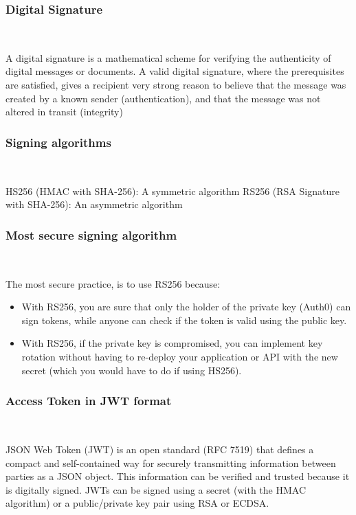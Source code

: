 \documentclass{beamer}
\begin{document}
\begin{frame}
	\frametitle{Digital Signature}\ \newline
	
	A digital signature is a mathematical scheme for verifying the authenticity of digital messages or documents. A valid digital signature, where the prerequisites are satisfied, gives a recipient very strong reason to believe that the message was created by a known sender (authentication), and that the message was not altered in transit (integrity)

\end{frame}

\begin{frame}
	\frametitle{Signing algorithms}\ \newline
	
HS256 (HMAC with SHA-256): A symmetric algorithm
RS256 (RSA Signature with SHA-256): An asymmetric algorithm
\end{frame}

\begin{frame}
	\frametitle{Most secure signing algorithm}\ \newline
	
The most secure practice, is to use RS256 because:

\begin{itemize}	
		\item With RS256, you are sure that only the holder of the private key (Auth0) can sign tokens, while anyone can check if the token is valid using the public key.
		\item With RS256, if the private key is compromised, you can implement key rotation without having to re-deploy your application or API with the new secret (which you would have to do if using HS256).
	\end{itemize}	

\end{frame}

\begin{frame}
	\frametitle{Access Token in JWT format}\ \newline
	
	JSON Web Token (JWT) is an open standard (RFC 7519) that defines a compact and self-contained way for securely transmitting information between parties as a JSON object. This information can be verified and trusted because it is digitally signed. JWTs can be signed using a secret (with the HMAC algorithm) or a public/private key pair using RSA or ECDSA.
\end{frame}
\end{document}
